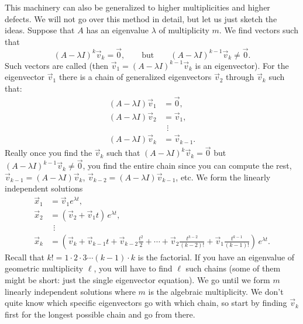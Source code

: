 This machinery can also be generalized to higher multiplicities
and higher defects.
We will not go over this method in detail, but let us just sketch the ideas.  Suppose that $A$
has an eigenvalue $\lambda$ of multiplicity $m$.
We find vectors such that
\begin{equation*}
{(A - \lambda I)}^k \vec{v}_k = \vec{0},
\qquad \text{but} \qquad
{(A - \lambda I)}^{k-1} \vec{v}_k \not= \vec{0}.
\end{equation*}
Such vectors are called \emph{} (then
$\vec{v}_1 = {(A - \lambda I)}^{k-1} \vec{v}_k$ is an eigenvector).
For the
eigenvector $\vec{v}_1$ there is a chain of generalized eigenvectors
$\vec{v}_2$ through $\vec{v}_k$ such that:
\begin{align*}
(A - \lambda I) \vec{v}_1 & = \vec{0} , \\
(A - \lambda I) \vec{v}_2 & = \vec{v}_1 , \\
& ~~\vdots \\
(A - \lambda I) \vec{v}_k & = \vec{v}_{k-1} .
\end{align*}
Really once you find the $\vec{v}_k$ such that
${(A - \lambda I)}^k \vec{v}_k = \vec{0}$ but
${(A - \lambda I)}^{k-1} \vec{v}_k \not= \vec{0}$, you find the entire
chain since you can compute the rest,
$\vec{v}_{k-1} = (A - \lambda I) \vec{v}_k$,
$\vec{v}_{k-2} = (A - \lambda I) \vec{v}_{k-1}$, etc.
We form the linearly independent solutions
\begin{align*}
\vec{x}_1 & = \vec{v}_1 e^{\lambda t} , \\
\vec{x}_2 & = ( \vec{v}_2 + \vec{v}_1 t ) \, e^{\lambda t} , \\
& ~~\vdots \\
\vec{x}_k & = \left( \vec{v}_k + \vec{v}_{k-1} t +
\vec{v}_{k-2} \frac{t^2}{2} +
\cdots + \vec{v}_2 \frac{t^{k-2}}{(k-2)!} + \vec{v}_1 \frac{t^{k-1}}{(k-1)!}
\right) \, e^{\lambda t} .
\end{align*}
Recall that $k! = 1 \cdot 2 \cdot 3 \cdots (k-1) \cdot k$ is the factorial.
If you have an eigenvalue of geometric multiplicity $\ell$,
you will have to find $\ell$ such chains (some of them might be
short: just the single eigenvector equation).
We go until we form $m$ linearly independent solutions where
$m$ is the algebraic multiplicity.
We don't quite know which specific eigenvectors go with which chain, so
start by finding $\vec{v}_k$ first for the longest possible chain and
go from there.

